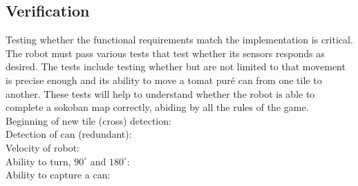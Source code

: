 \documentclass[../../main.tex]{subfiles}
\begin{document}
\subsection{Verification}%
\label{sub:verification}

Testing whether the functional requirements match the implementation is critical.
The robot must pass various tests that test whether its sensors responds as desired. The tests include testing whether but are not limited to that movement is precise enough and its ability to move a tomat puré can from one tile to another. These tests will help to understand whether the robot is able to complete a sokoban map correctly, abiding by all the rules of the game.
\\

Beginning of new tile (cross) detection:
\\

Detection of can (redundant):
\\

Velocity of robot:
\\

Ability to turn, $90^{\circ}$ and $180^{\circ}$:
\\

Ability to capture a can:


	
\end{document}
